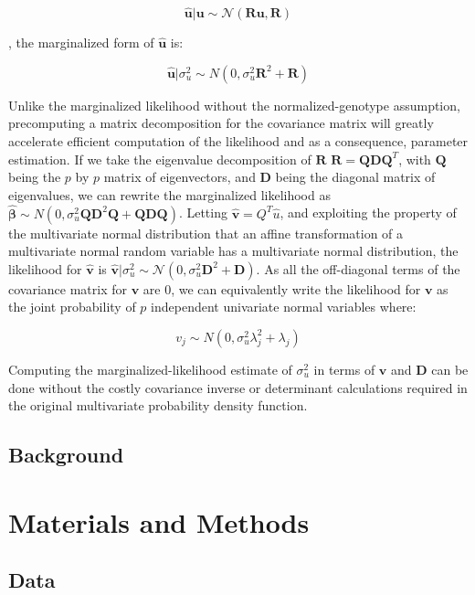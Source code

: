 $$\hat{\textbf{u}} | \textbf{u} \sim \mathcal{N}(\textbf{R} \textbf{u},\textbf{R})$$

, the marginalized form of $\hat{\textbf{u}}$ is:

\[ \hat{\textbf{u}}|\sigma_u^2 \sim N(0,\sigma_u^2\textbf{R}^2+\textbf{R})\]

Unlike the marginalized likelihood without the normalized-genotype assumption,
precomputing a matrix decomposition for the covariance matrix will greatly
accelerate efficient computation of the likelihood
and as a consequence, parameter estimation.
If we take the eigenvalue decomposition of $\textbf{R}$ $\textbf{R}=\textbf{Q}\textbf{D}\textbf{Q}^T$, with $\textbf{Q}$ 
being the $p$ by $p$ matrix of
eigenvectors, and $\textbf{D}$ being the diagonal matrix of eigenvalues, we can rewrite the marginalized likelihood as
$\hat{\boldsymbol{\beta}} \sim N(0,\sigma_u^2\textbf{QD}^2\textbf{Q}+\textbf{QDQ})$.  Letting
$\hat{\textbf{v}} = Q^{T}\hat{u}$, and exploiting the property of
the multivariate normal distribution that an affine transformation of a multivariate normal random variable has a multivariate normal distribution, the
likelihood for $\hat{\textbf{v}}$ is $\hat{\textbf{v}}|\sigma_u^2 \sim \mathcal{N}(0,\sigma_u^2\textbf{D}^{2}+\textbf{D})$.  As all the off-diagonal terms of
the covariance matrix for ${\textbf{v}}$ are $0$, we can equivalently write the likelihood for ${\textbf{v}}$ as the joint probability of $p$ independent
univariate normal variables where:

\[ v_j \sim N(0,\sigma^2_u\lambda_j^2+\lambda_j) \]

Computing the marginalized-likelihood estimate of $\sigma^2_u$ in terms of $\textbf{v}$ and $\textbf{D}$ can be done without the costly covariance inverse or determinant calculations required in the original multivariate probability density function.



\subsection{Background}\label{sec:org13cff0e}

\section{Materials and Methods}\label{sec:org762fc74}

\subsection{Data}\label{sec:org079c51d}



